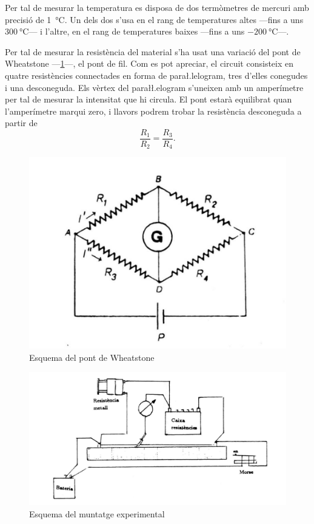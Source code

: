 Per tal de mesurar la temperatura es disposa de dos termòmetres de mercuri amb precisió de \SI{1}{\celsius}. Un dels dos s'usa en el rang de temperatures altes ---fins a uns $\SI{300}{\celsius}$--- i l'altre, en el rang de temperatures baixes ---fins a uns $ \SI{-200}{\celsius}$---.

Per tal de mesurar la resistència del material s'ha usat una variació del pont de Wheatstone ---\ref{fig:wheatstone}---, el pont de fil. Com es pot apreciar, el circuit consisteix en quatre resistències connectades en forma de para\l.lelogram, tres d'elles conegudes i una desconeguda. Els vèrtex del para\l\l.elogram s'uneixen amb un amperímetre per tal de mesurar la intensitat que hi circula. El pont estarà equilibrat quan l'amperímetre marqui zero, i llavors podrem trobar la resistència desconeguda a partir de
\begin{equation*}
\frac{R_1}{R_2}=\frac{R_3}{R_4}.
\end{equation*}

\begin{figure}[htb]
	\centering
	\includegraphics[scale=0.4]{pont.png}
	\caption{Esquema del pont de Wheatstone}
	\label{fig:wheatstone}
\end{figure}

\begin{figure}[htb]
	\centering
	\includegraphics[scale=0.4]{muntatge.png}
	\caption{Esquema del muntatge experimental}
	\label{fig:muntatge resistencia}
\end{figure}

